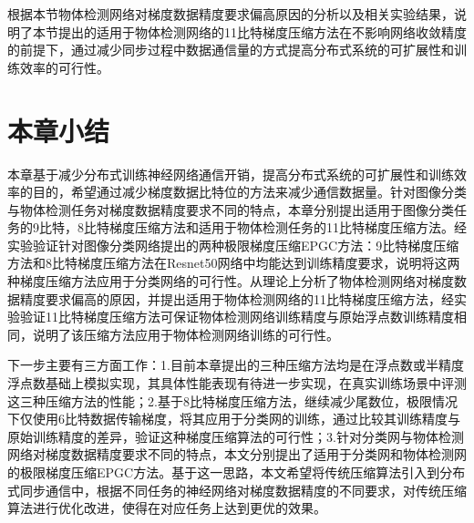 根据本节物体检测网络对梯度数据精度要求偏高原因的分析以及相关实验结果，说明了本节提出的适用于物体检测网络的11比特梯度压缩方法在不影响网络收敛精度的前提下，通过减少同步过程中数据通信量的方式提高分布式系统的可扩展性和训练效率的可行性。

\section{本章小结}

本章基于减少分布式训练神经网络通信开销，提高分布式系统的可扩展性和训练效率的目的，希望通过减少梯度数据比特位的方法来减少通信数据量。针对图像分类与物体检测任务对梯度数据精度要求不同的特点，本章分别提出适用于图像分类任务的9比特，8比特梯度压缩方法和适用于物体检测任务的11比特梯度压缩方法。经实验验证针对图像分类网络提出的两种极限梯度压缩EPGC方法：9比特梯度压缩方法和8比特梯度压缩方法在Resnet50网络中均能达到训练精度要求，说明将这两种梯度压缩方法应用于分类网络的可行性。从理论上分析了物体检测网络对梯度数据精度要求偏高的原因，并提出适用于物体检测网络的11比特梯度压缩方法，经实验验证11比特梯度压缩方法可保证物体检测网络训练精度与原始浮点数训练精度相同，说明了该压缩方法应用于物体检测网络训练的可行性。

下一步主要有三方面工作：1.目前本章提出的三种压缩方法均是在浮点数或半精度浮点数基础上模拟实现，其具体性能表现有待进一步实现，在真实训练场景中评测这三种压缩方法的性能；2.基于8比特梯度压缩方法，继续减少尾数位，极限情况下仅使用6比特数据传输梯度，将其应用于分类网的训练，通过比较其训练精度与原始训练精度的差异，验证这种梯度压缩算法的可行性；3.针对分类网与物体检测网络对梯度数据精度要求不同的特点，本文分别提出了适用于分类网和物体检测网的极限梯度压缩EPGC方法。基于这一思路，本文希望将传统压缩算法引入到分布式同步通信中，根据不同任务的神经网络对梯度数据精度的不同要求，对传统压缩算法进行优化改进，使得在对应任务上达到更优的效果。




